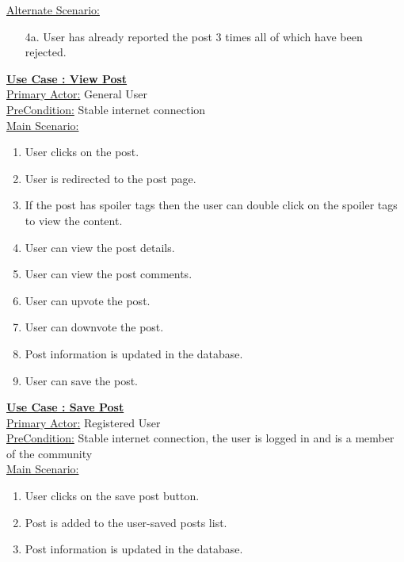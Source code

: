 \documentclass[conference,compsoc]{IEEEtran}
\newcounter{UC}
\newcommand{\nextU}{\stepcounter{UC}\theUC}
\begin{document}
\underline{Alternate Scenario:}\\
\begin{enumerate}
    \item [4a.] User has already reported the post 3 times all of which have been rejected.
\end{enumerate}\vspace{0.2cm}

\underline{\textbf{Use Case \nextU: View Post}}\\

\underline{Primary Actor:} General User\\

\underline{PreCondition:} Stable internet connection\\

\underline{Main Scenario:}\\
\begin{enumerate}
    \item User clicks on the post.
    \item User is redirected to the post page.
    \item If the post has spoiler tags then the user can double click on the spoiler tags to view the content.
    \item User can view the post details.
    \item User can view the post comments.
    \item User can upvote the post.
    \item User can downvote the post.
    \item Post information is updated in the database.
    \item User can save the post.
\end{enumerate}

\underline{\textbf{Use Case \nextU: Save Post}}\\

\underline{Primary Actor:} Registered User\\

\underline{PreCondition:} Stable internet connection, the user is logged in and is a member of the community\\

\underline{Main Scenario:}\\
\begin{enumerate}
    \item User clicks on the save post button.
    \item Post is added to the user-saved posts list.
    \item Post information is updated in the database.
\end{enumerate}
\end{document}
